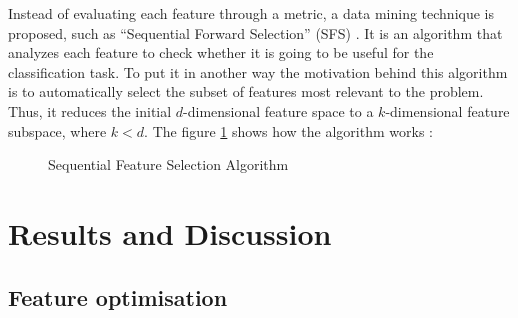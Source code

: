 \documentclass[../thesis.tex]{subfiles}
\begin{document}
    Instead of evaluating each feature through a metric, a data mining technique is proposed, such as ``Sequential Forward Selection'' (SFS) \cite{SFS-574797}. It is an algorithm that analyzes each feature to check whether it is going to be useful for the classification task. To put it in another way the motivation behind this algorithm is to automatically select the subset of features most relevant to the problem. Thus, it reduces the initial $d$-dimensional feature space to a $k$-dimensional feature subspace, where $k<d$. The figure \ref{fig:sequential-feature-selection} shows how the algorithm works :
    
    
    \begin{figure}[H]
        \centering
        
        \vspace{-1em}
        \caption{Sequential Feature Selection Algorithm}
        \label{fig:sequential-feature-selection}
    \end{figure}
    
    \section{Results and Discussion}
    \label{sec:weed-discrimination-results}
    
    \subsection{Feature optimisation}
    
\end{document}
